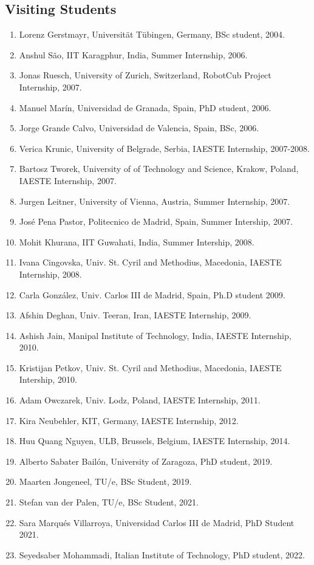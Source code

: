 \subsection{Visiting Students}\label{visiting-students}

\begin{enumerate}
\def\labelenumi{\arabic{enumi}.}
\item
  Lorenz Gerstmayr, Universität Tübingen, Germany, BSc student, 2004.
\item
  Anshul São, IIT Karagphur, India, Summer Internship, 2006.
\item
  Jonas Ruesch, University of Zurich, Switzerland, RobotCub Project
  Internship, 2007.
\item
  Manuel Marín, Universidad de Granada, Spain, PhD student, 2006.
\item
  Jorge Grande Calvo, Universidad de Valencia, Spain, BSc, 2006.
\item
  Verica Krunic, University of Belgrade, Serbia, IAESTE Internship,
  2007-2008.
\item
  Bartosz Tworek, University of of Technology and Science, Krakow,
  Poland, IAESTE Internship, 2007.
\item
  Jurgen Leitner, University of Vienna, Austria, Summer Internship,
  2007.
\item
  José Pena Pastor, Politecnico de Madrid, Spain, Summer Intership,
  2007.
\item
  Mohit Khurana, IIT Guwahati, India, Summer Intership, 2008.
\item
  Ivana Cingovska, Univ. St. Cyril and Methodius, Macedonia, IAESTE
  Internship, 2008.
\item
  Carla González, Univ. Carlos III de Madrid, Spain, Ph.D student 2009.
\item
  Afshin Deghan, Univ. Teeran, Iran, IAESTE Internship, 2009.
\item
  Ashish Jain, Manipal Institute of Technology, India, IAESTE
  Internship, 2010.
\item
  Kristijan Petkov, Univ. St. Cyril and Methodius, Macedonia, IAESTE
  Intership, 2010.
\item
  Adam Owczarek, Univ. Lodz, Poland, IAESTE Internship, 2011.
\item
  Kira Neubehler, KIT, Germany, IAESTE Internship, 2012.
\item
  Huu Quang Nguyen, ULB, Brussels, Belgium, IAESTE Internship, 2014.
\item
  Alberto Sabater Bailón, University of Zaragoza, PhD student, 2019.
\item
  Maarten Jongeneel, TU/e, BSc Student, 2019.
\item
  Stefan van der Palen, TU/e, BSc Student, 2021.
\item
  Sara Marqués Villarroya, Universidad Carlos III de Madrid, PhD Student
  2021.
\item
  Seyedsaber Mohammadi, Italian Institute of Technology, PhD student,
  2022.
\end{enumerate}
